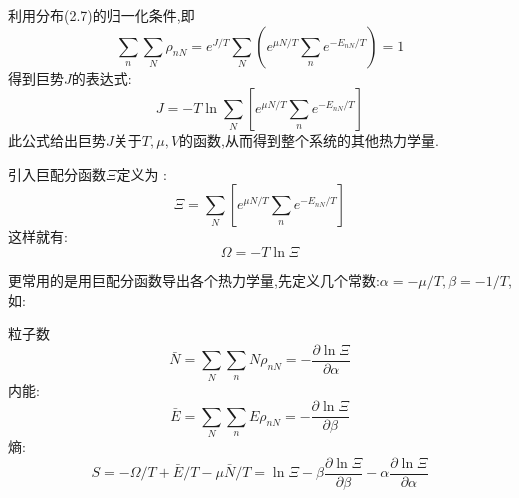 利用分布(2.7)的归一化条件,即 
\[\sum_n\sum_N \rho_{nN}=e^{J / T}\sum_N\left( e^{\mu N / T} \sum_n e^{-E_{nN} / T} \right) =1 \]
得到巨势$J$的表达式:
\begin{equation}
  J= -T \ln\sum_N\left[ e^{\mu N / T}\sum_ne^{-E_{nN} / T} \right] 
\end{equation}
此公式给出巨势$J$关于$T,\mu , V$的函数,从而得到整个系统的其他热力学量.

引入巨配分函数$\Xi$定义为 :
\begin{equation}
  \Xi=\sum_N\left[ e^{\mu N / T}\sum_ne^{-E_{nN} / T} \right]
\end{equation}
这样就有:
\begin{equation}
  \Omega=-T\ln\Xi
\end{equation}


更常用的是用巨配分函数导出各个热力学量,先定义几个常数:$\alpha=-\mu /T,\beta=-1/T$,如:

粒子数\[\bar{N}=\sum_N \sum _nN\rho_{nN}=-\dfrac{\partial \ln \Xi}{\partial \alpha}\]
内能:\[\bar{E}=\sum_N \sum_n E \rho_{nN}=-\dfrac{\partial \ln \Xi}{\partial \beta}\]
熵:\[S = -\Omega/T+\bar{E}/T -\mu \bar{N} /T=\ln \Xi-\beta\dfrac{\partial \ln\Xi}{\partial \beta}-\alpha\dfrac{\partial \ln\Xi}{\partial \alpha}\]

